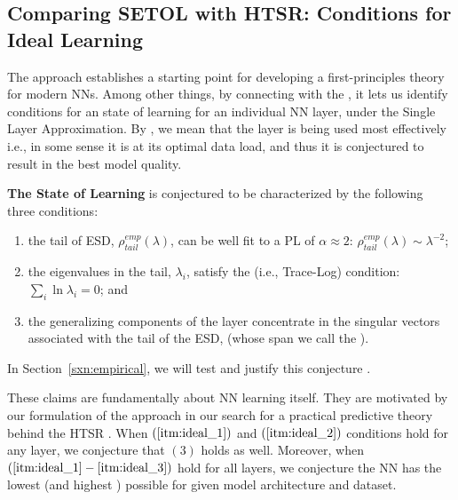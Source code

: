 \subsection{Comparing SETOL with HTSR: Conditions for Ideal Learning}
\label{sxn:ideal_learning}


The \SETOL approach establishes a starting point for developing a first-principles theory for modern NNs. %
Among other things, by connecting with the \HTSR \Phenomenology, it lets us identify conditions for an \Ideal state of learning for an individual NN layer, under the Single Layer Approximation.
By \Ideal, we mean that the layer is being used most effectively i.e., in some sense it is at its optimal data load, and thus it is conjectured to result in the best model quality.

\textbf{The \Ideal State of Learning} is conjectured to be characterized by the following three conditions:
\begin{enumerate} 
\item \label{itm:ideal_1}
  the tail of ESD, $\rho^{emp}_{tail}(\lambda)$, can be well fit to a PL of $\alpha\approx 2$: $\rho^{emp}_{tail}(\lambda)\sim\lambda^{-2}$;
\item \label{itm:ideal_2}
  the eigenvalues in the tail, $\lambda_{i}$, satisfy the \TRACELOG (i.e., Trace-Log) condition: $\sum_{i}\ln\lambda_{i}=0$; and
\item \label{itm:ideal_3}
  the generalizing components of the layer concentrate in the singular vectors associated with the tail of the ESD, (whose span we call the \EffectiveCorrelationSpace).
\end{enumerate}
In Section~\ref{sxn:empirical}, we will test and justify this conjecture .

These claims are fundamentally about NN learning itself. 
They are motivated by our formulation of the \SETOL approach in our search for a practical predictive theory behind the HTSR \Phenomenology.
When $(\ref{itm:ideal_1})$ and $(\ref{itm:ideal_2})$ conditions hold for any layer, we conjecture that $(3)$ holds as well.
Moreover, when $(\ref{itm:ideal_1}-\ref{itm:ideal_3})$ hold for all layers, we conjecture the
NN has the lowest \GeneralizationError (and highest \ModelQuality) possible for given model architecture and dataset.

